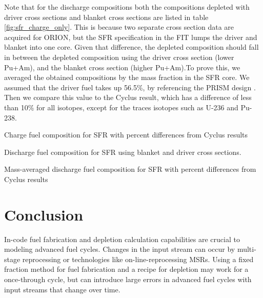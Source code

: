\documentclass{article}
\begin{document}
Note that for the discharge compositions both the compositions depleted with driver
cross sections and blanket cross sections are listed in table \ref{fig:sfr_charge_only}.
This is because two separate
cross section data are acquired for ORION, but the \gls{SFR} specification in the
\gls{FIT} lumps the driver and blanket into one core. Given that difference, the depleted
composition should fall in between the depleted composition using the driver cross section (lower Pu+Am),
and the blanket cross section (higher Pu+Am).To prove this, we averaged the
obtained compositions by the mass fraction in the \gls{SFR} core. We assumed that
the driver fuel takes up 56.5\%, by referencing the \gls{PRISM} design \cite{triplett_prism:_2012}.
Then we compare this value to the Cyclus result, which has a difference of less than 10\% for all
isotopes, except for the traces isotopes such as U-236 and Pu-238.


\begin{table}[h]
    \centering
    \resizebox{\textwidth}{!}{
    }
    \caption{Charge fuel composition for \gls{SFR} with percent differences from
             Cyclus results}
    \label{fig:sfr_charge}
\end{table}


\begin{table}[h]
    \centering
    \resizebox{\textwidth}{!}{
    }
    \caption{Discharge fuel composition for \gls{SFR} using blanket and driver cross sections.}
    \label{fig:sfr_charge_only}
\end{table}

\begin{table}[h]
    \centering
    \resizebox{\textwidth}{!}{
    }
    \caption{Mass-averaged discharge fuel composition for \gls{SFR} with percent differences from
             Cyclus results}
    \label{fig:sfr_discharge}
\end{table}


\FloatBarrier

\section{Conclusion}
In-code fuel fabrication and depletion calculation capabilities are crucial
to modeling advanced fuel cycles.
Changes in the input stream can occur by multi-stage reprocessing or
technologies like on-line-reprocessing \glspl{MSR}. Using a fixed fraction method
for fuel fabrication and a recipe for depletion may work for a once-through cycle,
but can introduce large errors in advanced fuel cycles with input streams that change over time.
\end{document}
